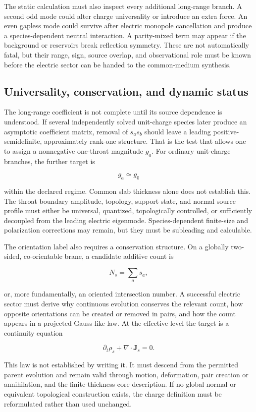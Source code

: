 The static calculation must also inspect every additional long-range branch. A
second odd mode could alter charge universality or introduce an extra force. An
even gapless mode could survive after electric monopole cancellation and produce
a species-dependent neutral interaction. A parity-mixed term may appear if the
background or reservoirs break reflection symmetry. These are not automatically
fatal, but their range, sign, source overlap, and observational role must be
known before the electric sector can be handed to the common-medium synthesis.

\subsection{Universality, conservation, and dynamic status}

The long-range coefficient is not complete until its source dependence is
understood. If several independently solved unit-charge species later produce
an asymptotic coefficient matrix, removal of \(s_as_b\) should leave a leading
positive-semidefinite, approximately rank-one structure. That is the test that
allows one to assign a nonnegative one-throat magnitude \(g_a\). For ordinary
unit-charge branches, the further target is

\[
g_a\simeq g_0
\]

within the declared regime. Common slab thickness alone does not establish this.
The throat boundary amplitude, topology, support state, and normal source
profile must either be universal, quantized, topologically controlled, or
sufficiently decoupled from the leading electric eigenmode. Species-dependent
finite-size and polarization corrections may remain, but they must be
subleading and calculable.

The orientation label also requires a conservation structure. On a globally
two-sided, co-orientable brane, a candidate additive count is

\[
N_s=\sum_a s_a,
\]

or, more fundamentally, an oriented intersection number. A successful electric
sector must derive why continuous evolution conserves the relevant count, how
opposite orientations can be created or removed in pairs, and how the count
appears in a projected Gauss-like law. At the effective level the target is a
continuity equation

\[
\partial_t\rho_s+\nabla\cdot\mathbf J_s=0.
\]

This law is not established by writing it. It must descend from the permitted
parent evolution and remain valid through motion, deformation, pair creation or
annihilation, and the finite-thickness core description. If no global normal or
equivalent topological construction exists, the charge definition must be
reformulated rather than used unchanged.

